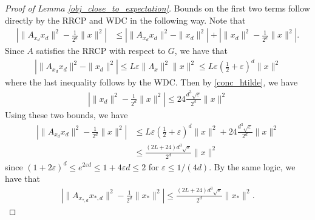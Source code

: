 \documentclass[11pt]{article}
\renewcommand{\epsilon}{\varepsilon}
\newcommand{\G}{G}
\renewcommand{\top}{{\mathrm{T}}}
\theoremstyle{remark}
\begin{document}
\begin{proof}[Proof of Lemma \ref{obj_close_to_expectation}]
Bounds on the first two terms follow directly by the RRCP and WDC in the following way. Note that \begin{align}
    \left|\|A_{x_d}x_d\|^2 - \frac{1}{2^d}\|x\|^2\right| & \leqslant \left|\|A_{x_d}x_d\|^2 - \|x_d\|^2\right| + \left| \|x_d\|^2 - \frac{1}{2^d}\|x\|^2\right|. \nonumber
\end{align} Since $A$ satisfies the RRCP with respect to $\G$, we have that \begin{align*}
    \left|\|A_{x_d}x_d\|^2 - \|x_d\|^2\right| \leqslant L\epsilon\|\Lambda_x\|^2\|x\|^2 \leqslant  L\epsilon\left(\frac{1}{2} + \epsilon\right)^d\|x\|^2
\end{align*} where the last inequality follows by the WDC. Then by \eqref{conc_htilde}, we have  \begin{align*}
     \left| \|x_d\|^2 - \frac{1}{2^d}\|x\|^2\right|\leqslant  24 \frac{d^3\sqrt{\epsilon}}{2^d}\|x\|^2
\end{align*}  Using these two bounds, we have \begin{align}
\left|\|A_{x_d}x_d\|^2 - \frac{1}{2^d}\|x\|^2\right| %
& \leqslant L\epsilon\left(\frac{1}{2} + \epsilon\right)^d\|x\|^2 + 24 \frac{d^3\sqrt{\epsilon}}{2^d}\|x\|^2 \nonumber\\
& \leqslant \frac{(2L + 24)d^3\sqrt{\epsilon}}{2^d}\|x\|^2 \label{conc_to_F_first_bound}
\end{align} since $(1+2\epsilon)^d \leqslant e^{2\epsilon d} \leqslant 1+4\epsilon d \leqslant 2$ for $\epsilon \leqslant 1/(4d)$. By the same logic, we have that  
\begin{align}
\left|\|A_{x_{*,d}}x_{*,d}\|^2 - \frac{1}{2^d}\|x_*\|^2\right| \leqslant \frac{(2L + 24)d^3\sqrt{\epsilon}}{2^d}\|x_*\|^2. \label{conc_to_F_second_bound}
\end{align} 


\end{proof}
\end{document}

